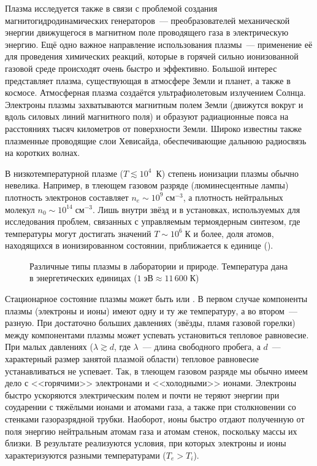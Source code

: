Плазма исследуется также в связи с проблемой создания магнитогидродинамических
генераторов~--- преобразователей
механической энергии движущегося в магнитном поле проводящего газа в
электрическую энергию. Ещё одно важное направление использования плазмы~---
применение её для проведения химических реакций, которые в горячей
сильно ионизованной газовой среде происходят очень быстро и эффективно.
Большой интерес представляет плазма, существующая в атмосфере Земли и планет, а
также в космосе. Атмосферная плазма создаётся ультрафиолетовым излучением
Солнца. Электроны плазмы захватываются магнитным полем Земли (движутся вокруг и
вдоль силовых линий магнитного поля) и образуют радиационные пояса на
расстояниях тысяч километров от поверхности Земли. Широко известны также
плазменные проводящие слои Хевисайда, обеспечивающие дальнюю радиосвязь
на коротких волнах.

В низкотемпературной плазме ($T\lesssim 10^4$~К) степень ионизации плазмы
обычно невелика. Например, в тлеющем газовом разряде (люминесцентные лампы)
плотность электронов составляет $n_e\sim 10^9\;\text{см}^{-3}$,
а плотность нейтральных молекул $n_0\sim 10^{14}\;\text{см}^{-3}$.
Лишь внутри звёзд и в установках, используемых для исследования проблем,
связанных с управляемым термоядерным синтезом,
где температуры могут достигать значений $T \sim 10^{6}\;К$ и более,
доля атомов, находящихся в ионизированном состоянии, приближается
к единице ().

\begin{figure}[ht]
    \centering
    {\footnotesize
    }
    \caption{Различные типы плазмы в лаборатории и природе. Температура
    дана в энергетических единицах ($1\;эВ\approx 11\,600\;К$)}
\end{figure}

Стационарное состояние плазмы может быть
 или .
В первом случае компоненты плазмы (электроны и ионы) имеют одну и ту же температуру,
а во втором~--- разную. При достаточно больших
давлениях (звёзды, пламя газовой горелки) между компонентами плазмы может
успевать установиться тепловое равновесие. При
малых давлениях ($\lambda\gtrsim d$, где $\lambda$~--- длина свободного пробега, а
$d$~--- характерный размер занятой
плазмой области) тепловое равновесие устанавливаться не успевает.
Так, в тлеющем газовом разряде мы обычно имеем дело с
<<горячими>> электронами и <<холодными>> ионами.
Электроны быстро ускоряются электрическим полем и почти не теряют
энергии при соударении с тяжёлыми ионами и атомами газа, а также при
столкновении со стенками газоразрядной трубки. Наоборот, ионы быстро отдают
полученную от поля энергию нейтральным атомам газа и атомам стенок, поскольку
массы их близки. В результате реализуются условия, при которых электроны
и ионы характеризуются разными температурами ($T_e > T_i$).

